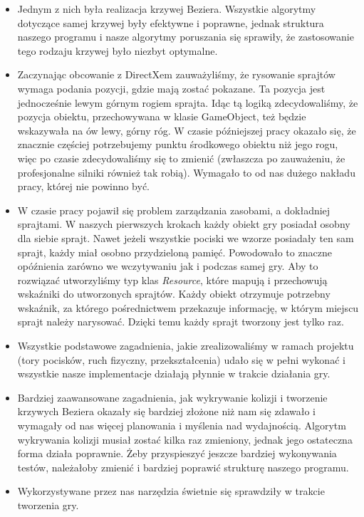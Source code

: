 	\begin{itemize}
		\item Jednym z nich była realizacja krzywej Beziera. Wszystkie algorytmy dotyczące samej krzywej były efektywne i poprawne, jednak struktura naszego programu i nasze algorytmy poruszania się sprawiły, że zastosowanie tego rodzaju krzywej było niezbyt optymalne.
		\item Zaczynając obcowanie z DirectXem zauważyliśmy, że rysowanie sprajtów wymaga podania pozycji, gdzie mają zostać pokazane. Ta pozycja jest jednocześnie lewym górnym rogiem sprajta. Idąc tą logiką zdecydowaliśmy, że pozycja obiektu, przechowywana w klasie GameObject, też będzie wskazywała na ów lewy, górny róg. W czasie późniejszej pracy okazało się, że znacznie częściej potrzebujemy punktu środkowego obiektu niż jego rogu, więc po czasie zdecydowaliśmy się to zmienić (zwłaszcza po zauważeniu, że profesjonalne silniki również tak robią). Wymagało to od nas dużego nakładu pracy, której nie powinno być.
		\item W czasie pracy pojawił się problem zarządzania zasobami, a dokładniej sprajtami. W naszych pierwszych krokach każdy obiekt gry posiadał osobny dla siebie sprajt. Nawet jeżeli wszystkie pociski we wzorze posiadały ten sam sprajt, każdy miał osobno przydzieloną pamięć. Powodowało to znaczne opóźnienia zarówno we wczytywaniu jak i podczas samej gry. Aby to rozwiązać utworzyliśmy typ klas \textit{Resource}, które mapują i przechowują wskaźniki do utworzonych sprajtów. Każdy obiekt otrzymuje potrzebny wskaźnik, za którego pośrednictwem przekazuje informację, w którym miejscu sprajt należy narysować. Dzięki temu każdy sprajt tworzony jest tylko raz.
		\item Wszystkie podstawowe zagadnienia, jakie zrealizowaliśmy w ramach projektu (tory pocisków, ruch fizyczny, przekształcenia) udało się w pełni wykonać i wszystkie nasze implementacje działają płynnie w trakcie działania gry.
		\item Bardziej zaawansowane zagadnienia, jak wykrywanie kolizji i tworzenie krzywych Beziera okazały się bardziej złożone niż nam się zdawało i wymagały od nas więcej planowania i myślenia nad wydajnością. Algorytm wykrywania kolizji musiał zostać kilka raz zmieniony, jednak jego ostateczna forma działa poprawnie. Żeby przyspieszyć jeszcze bardziej wykonywania testów, należałoby zmienić i bardziej poprawić strukturę naszego programu.
		\item Wykorzystywane przez nas narzędzia świetnie się sprawdziły w trakcie tworzenia gry.
	\end{itemize}
		